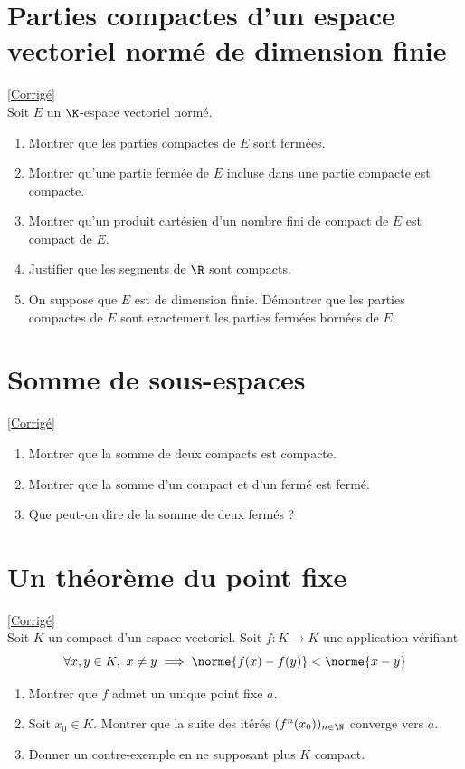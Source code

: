 \documentclass{book}
\begin{document}
\section{Parties compactes d'un espace vectoriel normé de dimension finie }
\label{Parties compactes d'un espace vectoriel normé de dimension finie}
\textcolor{blue}{\hyperref[sec:parties-compactes-dun-espace-vectoriel-norme-de-dimension-finie]{[Corrigé]}}\\
Soit $E$ un $\K$-espace vectoriel normé.
\begin{enumerate}
	\item Montrer que les parties compactes de $E$ sont fermées.
	\item Montrer qu'une partie fermée de $E$ incluse dans une partie compacte est compacte.
	\item Montrer qu'un produit cartésien d'un nombre fini de compact de $E$ est compact de $E$.
	\item Justifier que les segments de $\R$ sont compacts.
	\item On suppose que $E$ est de dimension finie. Démontrer que les parties compactes de $E$ sont exactement les parties fermées bornées de $E$.
\end{enumerate}

\section{Somme de sous-espaces }
\label{Somme de sous-espaces}
\textcolor{blue}{\hyperref[sec:somme-de-sous-espaces]{[Corrigé]}}\\
\begin{enumerate}[leftmargin=*]
	\item Montrer que la somme de deux compacts est compacte.
	\item Montrer que la somme d'un compact et d'un fermé est fermé.
	\item Que peut-on dire de la somme de deux fermés ?
\end{enumerate}

\section{Un théorème du point fixe }
\label{Théorème du point fixe}
\textcolor{blue}{\hyperref[Théorème du point fixe corrigé]{[Corrigé]}}\\
Soit $K$ un compact d'un espace vectoriel. Soit $f:K\to K$ une application vérifiant
$$\forall x,y\in K,\ x\ne y\implies \norme{f(x)-f(y)}<\norme{x-y}$$
\begin{enumerate}
	\item Montrer que $f$ admet un unique point fixe $a$.
	\item Soit $x_0\in K$. Montrer que la suite des itérés $(f^n(x_0))_{n\in \N}$ converge vers $a$.
	\item Donner un contre-exemple en ne supposant plus $K$ compact.
\end{enumerate}
\end{document}
